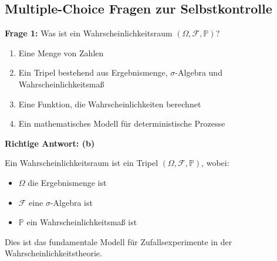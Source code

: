 \begin{denoobification}[Stoppzeit]
\begin{center}
\end{center}
\end{denoobification}

\vspace{0.5cm}


\subsection{Multiple-Choice Fragen zur Selbstkontrolle}

\begin{multiplechoice}
\textbf{Frage 1:} Was ist ein Wahrscheinlichkeitsraum $(\Omega, \mathcal{F}, \mathbb{P})$?

\begin{enumerate}[label=(\alph*)]
    \item Eine Menge von Zahlen
    \item Ein Tripel bestehend aus Ergebnismenge, $\sigma$-Algebra und Wahrscheinlichkeitsmaß
    \item Eine Funktion, die Wahrscheinlichkeiten berechnet
    \item Ein mathematisches Modell für deterministische Prozesse
\end{enumerate}

\begin{solution}
\textbf{Richtige Antwort: (b)}

Ein Wahrscheinlichkeitsraum ist ein Tripel $(\Omega, \mathcal{F}, \mathbb{P})$, wobei:
\begin{itemize}
    \item $\Omega$ die Ergebnismenge ist
    \item $\mathcal{F}$ eine $\sigma$-Algebra ist
    \item $\mathbb{P}$ ein Wahrscheinlichkeitsmaß ist
\end{itemize}

Dies ist das fundamentale Modell für Zufallsexperimente in der Wahrscheinlichkeitstheorie.
\end{solution}
\end{multiplechoice}

